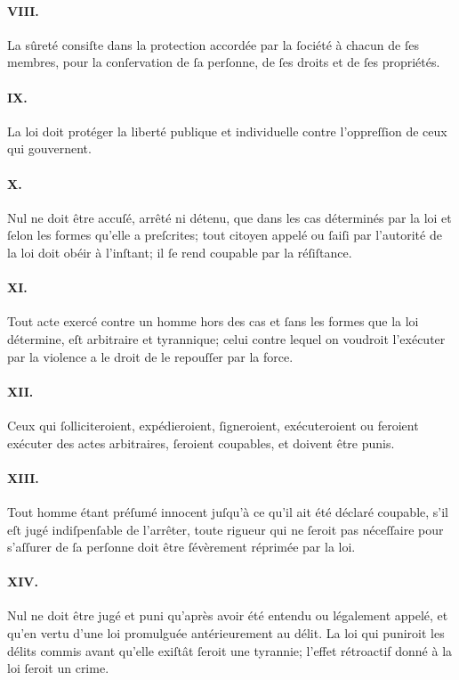 \documentclass[10pt]{lecturenotes}
\begin{document}
\paragraph*{VIII.}La sûreté consiſte dans la protection accordée par la ſociété à chacun de ſes membres, pour la conſervation de ſa perſonne, de ſes droits et de ſes propriétés.
\paragraph*{IX.}La loi doit protéger la liberté publique et individuelle contre l'oppreſſion de ceux qui gouvernent.
\paragraph*{X.}Nul ne doit être accuſé, arrêté ni détenu, que dans les cas déterminés par la loi et ſelon les formes qu'elle a preſcrites; tout citoyen appelé ou ſaiſi par l'autorité de la loi doit obéir à l'inſtant; il ſe rend coupable par la réſiſtance.
\paragraph*{XI.}Tout acte exercé contre  un homme hors des cas et ſans les formes que la loi détermine, eſt arbitraire et tyrannique; celui contre lequel on voudroit l'exécuter par la violence a le droit de le repouſſer par la force.

\paragraph*{XII.}Ceux qui ſolliciteroient, expédieroient, ſigneroient, exécuteroient ou feroient exécuter des actes arbitraires, ſeroient coupables, et doivent être punis.
\paragraph*{XIII.}Tout homme étant préſumé innocent juſqu'à ce qu'il ait été déclaré coupable, s'il eſt jugé indiſpenſable de l'arrêter, toute rigueur qui ne ſeroit pas néceſſaire pour s'aſſurer de ſa perſonne doit être ſévèrement réprimée par la loi.
\paragraph*{XIV.}Nul ne doit être jugé et puni qu'après avoir été entendu ou légalement appelé, et qu'en vertu d'une loi promulguée antérieurement au délit. La loi qui puniroit les délits commis avant qu'elle exiſtât ſeroit une tyrannie; l'effet rétroactif donné à la loi ſeroit un crime.
\end{document}

